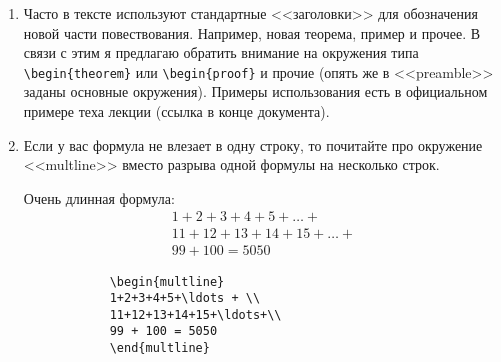 \begin{enumerate}
\begin{table*}[!ht]
\begin{multicols}{2}
			\columnbreak
			\begin{verbatim}
			\sum (\sum\limits_{k = 0}^n 
			(e^{-\ln k + 2\ln\ln k}))
			\end{verbatim}
		\end{multicols}
		
	\end{table*}
	
	
	\begin{table}[!ht]
		И еще пример (\verb|\left, \right| можно использовать с любыми скобками):
		$$
		\lim_{n \to \infty}P\brackets{\left|\frac{\sum\limits_{i = 1}^{n}\xi_i - \E\brackets{\sum\limits_{i = 1}^{n}\xi_i}}{n^{\frac{1}{2} + \delta}}\right| > \epsilon} = 0 \Longleftrightarrow 
		\lim_{n \to \infty}P(|\frac{\sum\limits_{i = 1}^{n}\xi_i - \E(\sum\limits_{i = 1}^{n}\xi_i)}{n^{\frac{1}{2} + \delta}}| > \epsilon) = 0
		$$
	\end{table}
	Наверное, стало понятно, что автор хотел до вас донести. Делайте выводы сами. 
	
	\item Часто в тексте используют стандартные <<заголовки>> для обозначения новой части повествования.
	Например, новая теорема, пример и прочее. 
	В связи с этим я предлагаю обратить внимание на окружения типа \verb|\begin{theorem}| или \verb|\begin{proof}|  и прочие (опять же в <<preamble>> заданы основные окружения). Примеры использования есть в официальном примере теха лекции (ссылка в конце документа). 
	
	\item Если у вас формула не влезает в одну строку, то почитайте про окружение <<multline>> вместо разрыва одной формулы на несколько строк.
	\begin{table}[!ht]
		\begin{multicols}{2}
			Очень длинная формула:
			\begin{multline}
			1 + 2 + 3 + 4 + 5 + \ldots + \\
			11 + 12 +13 + 14 + 15 + \ldots + \\ 
			99 + 100 = 5050
			\end{multline}
			
			\columnbreak
			
			\begin{verbatim}
			\begin{multline}
			1+2+3+4+5+\ldots + \\
			11+12+13+14+15+\ldots+\\ 
			99 + 100 = 5050
			\end{multline}
			\end{verbatim}
		\end{multicols}
	\end{table}
	

\end{enumerate}
